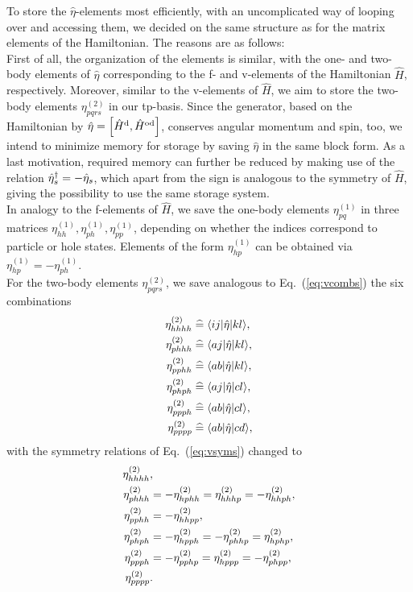 To store the $\hat{\eta}$-elements most efficiently, with an uncomplicated way of looping over and accessing them, we decided on the same structure as for the matrix elements of the Hamiltonian. The reasons are as follows:\\
First of all, the organization of the elements is similar, with the one- and two-body elements of $\hat{\eta}$ corresponding to the f- and v-elements of the Hamiltonian $\hat{H}$, respectively. Moreover, similar to the v-elements of $\hat{H}$, we aim to store the two-body elements $\eta_{pqrs}^{(2)}$ in our tp-basis. Since the generator, based on the Hamiltonian by $\hat{\eta} = \left[ \hat{H}^{\rm d}, \hat{H}^{\rm od} \right]$, conserves angular momentum and spin, too,  we intend to minimize memory for storage by saving $\hat{\eta}$ in the same block form. As a last motivation, required memory can further be reduced by making use of the relation $\hat{\eta}_s^\dagger = -\hat{\eta}_s$, which apart from the sign is analogous to the symmetry of $\hat{H}$, giving the possibility to use the same storage system.\\
In analogy to the f-elements of $\hat{H}$, we save the one-body elements $\eta_{pq}^{(1)}$ in three matrices $\eta_{hh}^{(1)}, \eta_{ph}^{(1)}, \eta_{pp}^{(1)}$, depending on whether the indices correspond to particle or hole states. Elements of the form $\eta_{hp}^{(1)}$ can be obtained via $\eta_{hp}^{(1)} = -\eta_{ph}^{(1)}$. \\
For the two-body elements $\eta_{pqrs}^{(2)}$, we save analogous to Eq.~(\ref{eq:vcombs}) the six combinations
\begin{align}
\eta_{hhhh}^{(2)} &\corresp \langle i j | \hat{\eta} | k l \rangle, \notag \\
\eta_{phhh}^{(2)} &\corresp \langle a j | \hat{\eta} | k l \rangle, \notag \\
\eta_{pphh}^{(2)} &\corresp \langle a b | \hat{\eta} | k l \rangle, \notag \\
\eta_{phph}^{(2)} &\corresp \langle a j | \hat{\eta} | c l \rangle, \notag \\
\eta_{ppph}^{(2)} &\corresp \langle a b | \hat{\eta} | c l \rangle, \notag \\
\eta_{pppp}^{(2)} &\corresp \langle a b | \hat{\eta} | c d \rangle,
\label{eq:etacombs}
\end{align}
with the symmetry relations of Eq.~(\ref{eq:vsyms}) changed to
\begin{align}
\eta_{hhhh}^{(2)} &, \notag \\
\eta_{phhh}^{(2)} &= -\eta_{hphh}^{(2)} = \eta_{hhhp}^{(2)} = -\eta_{hhph}^{(2)}, \notag \\
\eta_{pphh}^{(2)} &= -\eta_{hhpp}^{(2)}, \notag \\
\eta_{phph}^{(2)} &= -\eta_{hpph}^{(2)} = -\eta_{phhp}^{(2)} = \eta_{hphp}^{(2)}, \notag \\
\eta_{ppph}^{(2)} &= -\eta_{pphp}^{(2)} = \eta_{hppp}^{(2)} = -\eta_{phpp}^{(2)}, \notag \\
\eta_{pppp}^{(2)} &.
\label{eq:etasyms}
\end{align}
